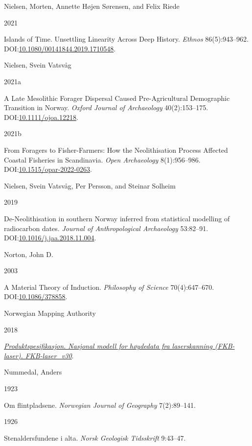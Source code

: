\documentclass[
  12pt,
  a4paper,
  oneside]{book}
\newlength{\cslhangindent}
\newlength{\csllabelwidth}
\newlength{\cslentryspacingunit} %
\newenvironment{CSLReferences}[2] %
 {%
  \setlength{\parindent}{0pt}
  \ifodd #1
  \let\oldpar\par
  \def\par{\hangindent=\cslhangindent\oldpar}
  \fi
  \setlength{\parskip}{#2\cslentryspacingunit}
 }%
 {}
\newcommand{\CSLBlock}[1]{#1\hfill\break}
\newcommand{\CSLLeftMargin}[1]{\parbox[t]{\csllabelwidth}{#1}}
\newcommand{\CSLRightInline}[1]{\parbox[t]{\linewidth - \csllabelwidth}{#1}\break}
\begin{document}
\begin{CSLReferences}{0}{0}
\leavevmode{}%
\CSLBlock{Nielsen, Morten, Annette Højen Sørensen, and Felix Riede}
\CSLLeftMargin{ 2021}%
\CSLRightInline{{Islands of Time. Unsettling Linearity Across Deep History}. \emph{Ethnos} 86(5):943--962. DOI:\href{https://doi.org/10.1080/00141844.2019.1710548}{10.1080/00141844.2019.1710548}.}

\leavevmode{}%
\CSLBlock{Nielsen, Svein Vatsvåg}
\CSLLeftMargin{ 2021a}%
\CSLRightInline{A Late Mesolithic Forager Dispersal Caused Pre-Agricultural Demographic Transition in Norway. \emph{Oxford Journal of Archaeology} 40(2):153--175. DOI:\href{https://doi.org/10.1111/ojoa.12218}{10.1111/ojoa.12218}.}

\leavevmode{}%
\CSLLeftMargin{ 2021b }%
\CSLRightInline{From Foragers to Fisher-Farmers: How the Neolithisation Process Affected Coastal Fisheries in Scandinavia. \emph{Open Archaeology} 8(1):956--986. DOI:\href{https://doi.org/10.1515/opar-2022-0263}{10.1515/opar-2022-0263}.}

\leavevmode{}%
\CSLBlock{Nielsen, Svein Vatsvåg, Per Persson, and Steinar Solheim}
\CSLLeftMargin{ 2019}%
\CSLRightInline{De-Neolithisation in southern Norway inferred from statistical modelling of radiocarbon dates. \emph{Journal of Anthropological Archaeology} 53:82--91. DOI:\href{https://doi.org/10.1016/j.jaa.2018.11.004}{10.1016/j.jaa.2018.11.004}.}

\leavevmode{}%
\CSLBlock{Norton, John D.}
\CSLLeftMargin{ 2003}%
\CSLRightInline{{A Material Theory of Induction}. \emph{Philosophy of Science} 70(4):647--670. DOI:\href{https://doi.org/10.1086/378858}{10.1086/378858}.}

\leavevmode{}%
\CSLBlock{Norwegian Mapping Authority}
\CSLLeftMargin{ 2018}%
\CSLRightInline{\emph{\href{https://hoydedata.no}{Produktspesifikasjon. Nasjonal modell for høydedata fra laserskanning (FKB-laser). FKB-laser\_v30}}.}

\leavevmode{}%
\CSLBlock{Nummedal, Anders}
\CSLLeftMargin{ 1923}%
\CSLRightInline{Om flintpladsene. \emph{Norwegian Journal of Geography} 7(2):89--141.}

\leavevmode{}%
\CSLLeftMargin{ 1926 }%
\CSLRightInline{Stenaldersfundene i alta. \emph{Norsk Geologisk Tidsskrift} 9:43--47.}


\end{CSLReferences}
\end{document}
